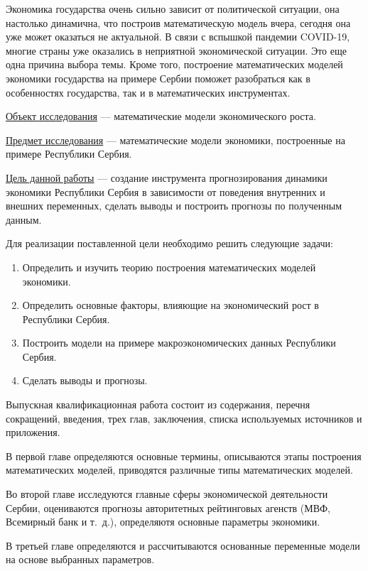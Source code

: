 Экономика государства очень сильно зависит от политической ситуации, она настолько динамична, что построив математическую модель вчера, сегодня она уже может оказаться не актуальной. В связи с вспышкой пандемии COVID-19, многие страны уже оказались в неприятной экономической ситуации.
Это еще одна причина выбора темы.
Кроме того, построение математических моделей экономики государства на примере Сербии поможет разобраться как в особенностях государства, так и в математических инструментах.

\underline{Объект исследования} --- математические модели экономического роста.

\underline{Предмет исследования} --- математические модели экономики, построенные на примере Республики Сербия.

\underline{Цель данной работы} --- создание инструмента прогнозирования динамики экономики Республики Сербия в зависимости от поведения внутренних и внешних переменных, сделать выводы и построить прогнозы по полученным данным.

Для реализации поставленной цели необходимо решить следующие задачи:
\begin{enumerate}
	\item Определить и изучить теорию построения математических моделей экономики.
	\item Определить основные факторы, влияющие на экономический рост в Республики Сербия.
	\item Построить модели на примере макроэкономических данных Республики Сербия.
	\item Сделать выводы и прогнозы.
\end{enumerate}

Выпускная квалификационная работа состоит из содержания, перечня сокращений, введения, трех глав, заключения, списка используемых источников и приложения.

В первой главе определяются основные термины, описываются этапы построения математических моделей, приводятся различные типы математических моделей.

Во второй главе исследуются главные сферы экономической деятельности Сербии, оцениваются прогнозы авторитетных рейтинговых агенств (МВФ, Всемирный банк и т.~д.), определяютя основные параметры экономики.

В третьей главе определяются и рассчитываются основанные переменные модели на основе выбранных параметров.

